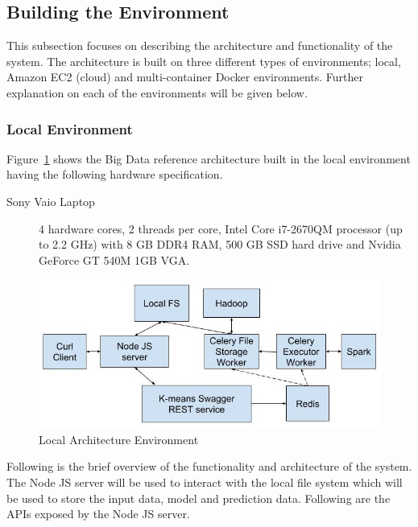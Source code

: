 \subsection{Building the Environment}

This subsection focuses on describing the architecture and functionality of 
the system. The architecture is built on three different types of 
environments; local, Amazon EC2 (cloud) and multi-container Docker 
environments. Further explanation on each of the environments will be given 
below.

\subsubsection{Local Environment}
\label{subsubsec:localenv}

Figure~\ref{fig:localarchitecture} shows the Big Data reference architecture 
built in the local environment having the following hardware specification.

\begin{description}
	\item[Sony Vaio Laptop] 4 hardware cores, 2 threads per core, Intel Core 
	i7-2670QM processor (up to 2.2 GHz) with 8 GB DDR4 RAM, 500 GB SSD hard 
	drive and Nvidia GeForce GT 540M 1GB VGA.
\end{description}

\begin{figure}[htbp] 
	\centering
	\includegraphics[width=\columnwidth]{images/localarchitecture.jpg}
	\caption{Local Architecture Environment}
\label{fig:localarchitecture} 
\end{figure}

Following is the brief overview of the functionality and architecture 
of the system. The Node JS server will be used to interact with the local file 
system which will be used to store the input data, model and prediction data. 
Following are the APIs exposed by the Node JS server.

